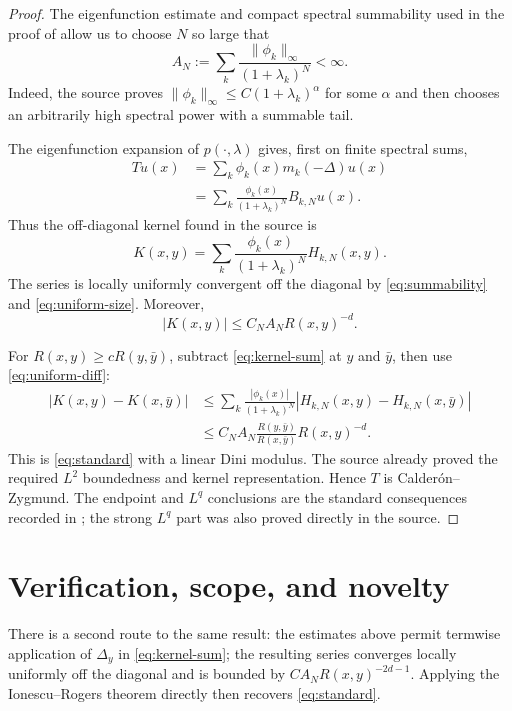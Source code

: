 \documentclass[11pt]{article}
\newcommand{\Rmet}{R}
\begin{document}
\begin{proof}
The eigenfunction estimate and compact spectral summability used in the proof
of \cite[Theorem 9.5]{IRS} allow us to choose $N$ so large that
\begin{equation}\label{eq:summability}
 A_N:=\sum_k
 \frac{\|\phi_k\|_\infty}{(1+\lambda_k)^N}<\infty.
\end{equation}
Indeed, the source proves $\|\phi_k\|_\infty\le C(1+\lambda_k)^\alpha$
for some $\alpha$ and then chooses an arbitrarily high spectral power with a
summable tail.

The eigenfunction expansion of $p(\cdot,\lambda)$ gives, first on finite
spectral sums,
\begin{align*}
 Tu(x)
 &=\sum_k \phi_k(x)m_k(-\Delta)u(x)\\
 &=\sum_k\frac{\phi_k(x)}{(1+\lambda_k)^N}B_{k,N}u(x).
\end{align*}
Thus the off-diagonal kernel found in the source is
\begin{equation}\label{eq:kernel-sum}
 K(x,y)=\sum_k
 \frac{\phi_k(x)}{(1+\lambda_k)^N}H_{k,N}(x,y).
\end{equation}
The series is locally uniformly convergent off the diagonal by
\eqref{eq:summability} and \eqref{eq:uniform-size}. Moreover,
\[
 |K(x,y)|
 \le C_N A_N\Rmet(x,y)^{-d}.
\]

For $\Rmet(x,y)\ge c\Rmet(y,\bar y)$, subtract \eqref{eq:kernel-sum} at
$y$ and $\bar y$, then use \eqref{eq:uniform-diff}:
\begin{align*}
 |K(x,y)-K(x,\bar y)|
 &\le \sum_k\frac{|\phi_k(x)|}{(1+\lambda_k)^N}
 |H_{k,N}(x,y)-H_{k,N}(x,\bar y)|\\
 &\le C_N A_N
 \frac{\Rmet(y,\bar y)}{\Rmet(x,\bar y)}
 \Rmet(x,y)^{-d}.
\end{align*}
This is \eqref{eq:standard} with a linear Dini modulus. The source already
proved the required $L^2$ boundedness and kernel representation. Hence $T$ is
Calder\'on--Zygmund. The endpoint and $L^q$ conclusions are the standard
consequences recorded in \cite{IR}; the strong $L^q$ part was also proved
directly in the source.
\end{proof}

\section{Verification, scope, and novelty}
There is a second route to the same result: the estimates above permit
termwise application of $\Delta_y$ in \eqref{eq:kernel-sum}; the resulting
series converges locally uniformly off the diagonal and is bounded by
$C A_N\Rmet(x,y)^{-2d-1}$. Applying the Ionescu--Rogers theorem directly then
recovers \eqref{eq:standard}.
\end{document}
